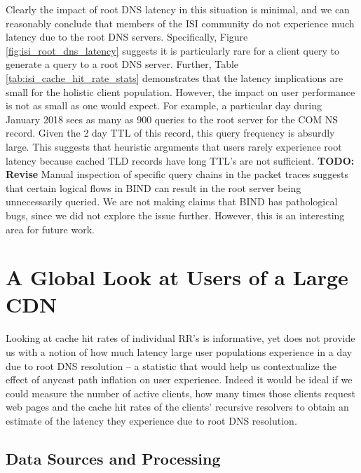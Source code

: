 \documentclass[sigconf,nonacm,10pt]{acmart}
\begin{document}
Clearly the impact of root DNS latency in this situation is minimal, and
we can reasonably conclude that members of the ISI community do not
experience much latency due to the root DNS servers. Specifically,
Figure \ref{fig:isi_root_dns_latency} suggests it is particularly rare
for a client query to generate a query to a root DNS server. Further,
Table \ref{tab:isi_cache_hit_rate_stats} demonstrates that the latency
implications are small for the holistic client population. However, the
impact on user performance is not as small as one would expect. For
example, a particular day during January 2018 sees as many as 900
queries to the root server for the COM NS record. Given the 2 day TTL of
this record, this query frequency is absurdly large. This suggests that
heuristic arguments that users rarely experience root latency because
cached TLD records have long TTL's are not sufficient. \break 
\textbf{TODO: Revise} Manual inspection of specific query chains in the
packet traces suggests that certain logical flows in BIND can result in
the root server being unnecessarily queried. We are not making claims
that BIND has pathological bugs, since we did not explore the issue
further. However, this is an interesting area for future work.

\section{A Global Look at Users of a Large
CDN}\label{a-global-look-at-users-of-a-large-cdn-1}

Looking at cache hit rates of individual RR's is informative, yet does
not provide us with a notion of how much latency large user populations
experience in a day due to root DNS resolution -- a statistic that would
help us contextualize the effect of anycast path inflation on user
experience. Indeed it would be ideal if we could measure the number of
active clients, how many times those clients request web pages and the
cache hit rates of the clients' recursive resolvers to obtain an
estimate of the latency they experience due to root DNS resolution.

\subsection{Data Sources and
Processing}\label{data-sources-and-processing-1}
\end{document}
